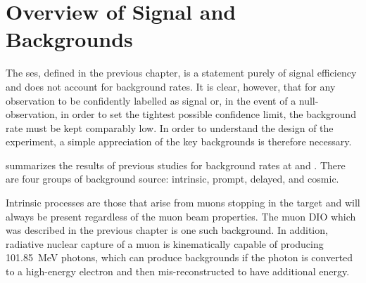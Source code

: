 \section{Overview of Signal and Backgrounds}
The \acf{ses}, defined in the previous chapter, is a statement purely of signal efficiency and does not account for background rates.
It is clear, however, that for any observation to be confidently labelled as signal or, in the event of a null-observation, in order to set the tightest possible confidence limit, the background rate must be kept comparably low.
In order to understand the design of the \COMET experiment, a simple appreciation of the key backgrounds is therefore necessary.


\TabBackgroundSummary%
 summarizes the results of previous studies for background rates at \phaseI and \phaseII.
There are four groups of background source: intrinsic, prompt, delayed, and cosmic.

Intrinsic processes are those that arise from muons stopping in the target and will always be present regardless of the muon beam properties.
The muon \ac{DIO} which was described in the previous chapter is one such background.
In addition, radiative nuclear capture of a muon is kinematically capable of producing 101.85~MeV photons, which can produce backgrounds if the photon is converted to a high-energy electron and then mis-reconstructed to have additional energy.



